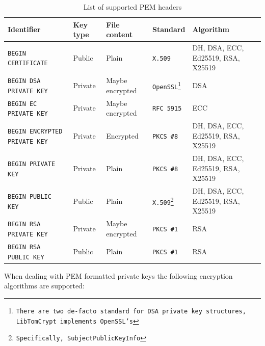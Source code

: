\documentclass[synpaper]{book}
\begin{document}
\begin{table}[H]
\begin{minipage}{\textwidth}
\begin{small}
\begin{tabular}{|l|l|l|l|l|}
\hline \textbf{Identifier}                   & \textbf{Key type} & \textbf{File content} & \textbf{Standard} & \textbf{Algorithm} \\
\hline \texttt{BEGIN CERTIFICATE}            & Public            & Plain                 & \texttt{X.509}    & DH, DSA, ECC, Ed25519, RSA, X25519 \\
\hline \texttt{BEGIN DSA PRIVATE KEY}        & Private           & Maybe encrypted       & \texttt{OpenSSL\footnote{There are two de-facto standard for DSA private key structures, LibTomCrypt implements OpenSSL's}} & DSA \\
\hline \texttt{BEGIN EC PRIVATE KEY}         & Private           & Maybe encrypted       & \texttt{RFC 5915} & ECC \\
\hline \texttt{BEGIN ENCRYPTED PRIVATE KEY}  & Private           & Encrypted             & \texttt{PKCS \#8} & DH, DSA, ECC, Ed25519, RSA, X25519 \\
\hline \texttt{BEGIN PRIVATE KEY}            & Private           & Plain                 & \texttt{PKCS \#8} & DH, DSA, ECC, Ed25519, RSA, X25519 \\
\hline \texttt{BEGIN PUBLIC KEY}             & Public            & Plain                 & \texttt{X.509\footnote{Specifically, SubjectPublicKeyInfo}} & DH, DSA, ECC, Ed25519, RSA, X25519 \\
\hline \texttt{BEGIN RSA PRIVATE KEY}        & Private           & Maybe encrypted       & \texttt{PKCS \#1} & RSA \\
\hline \texttt{BEGIN RSA PUBLIC KEY}         & Public            & Plain                 & \texttt{PKCS \#1} & RSA \\
\hline
\end{tabular}
\end{small}
\end{minipage}
\caption{List of supported PEM headers}
\label{supported-PEM-headers}
\end{table}

When dealing with PEM formatted private keys the following encryption algorithms are supported:
\end{document}
